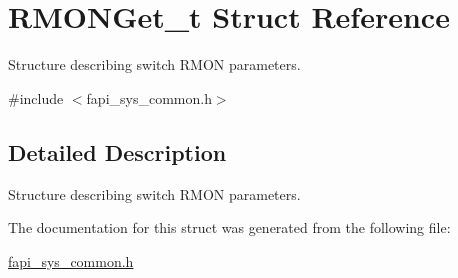 \hypertarget{structRMONGet__t}{\section{R\-M\-O\-N\-Get\-\_\-t Struct Reference}
\label{structRMONGet__t}
}


Structure describing switch R\-M\-O\-N parameters.  




{\ttfamily \#include $<$fapi\-\_\-sys\-\_\-common.\-h$>$}



\subsection{Detailed Description}
Structure describing switch R\-M\-O\-N parameters. 

The documentation for this struct was generated from the following file\-:\begin{DoxyCompactItemize}
\item 
\hyperlink{fapi__sys__common_8h}{fapi\-\_\-sys\-\_\-common.\-h}\end{DoxyCompactItemize}
